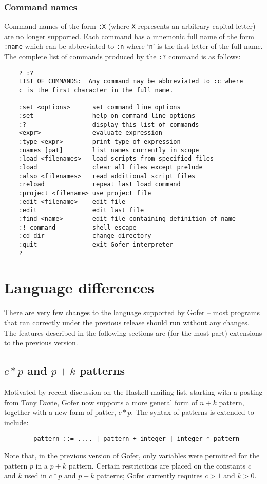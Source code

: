 \subsubsection{Command names}
Command names of the form \verb":X" (where \verb"X" 
represents an arbitrary capital
letter) are no longer supported.  Each command has a mnemonic full name
of the form \verb":name" which can be abbreviated to \verb":n" 
where `\verb"n"' is the first
letter of the full name.  The complete list of commands produced by the
\verb":?" command is as follows:
\begin{verbatim}
    ? :?
    LIST OF COMMANDS:  Any command may be abbreviated to :c where
    c is the first character in the full name.
 
    :set <options>      set command line options
    :set                help on command line options
    :?                  display this list of commands
    <expr>              evaluate expression
    :type <expr>        print type of expression
    :names [pat]        list names currently in scope
    :load <filenames>   load scripts from specified files
    :load               clear all files except prelude
    :also <filenames>   read additional script files
    :reload             repeat last load command
    :project <filename> use project file
    :edit <filename>    edit file
    :edit               edit last file
    :find <name>        edit file containing definition of name
    :! command          shell escape
    :cd dir             change directory
    :quit               exit Gofer interpreter
    ?
\end{verbatim}


\section{Language differences}

There are very few changes to the language supported by Gofer -- most
programs that ran correctly under the previous release should run
without any changes.  The features described in the following sections
are (for the most part) extensions to the previous version.

\subsection{$c*p$ and $p+k$ patterns}
Motivated by recent discussion on the Haskell mailing list, starting
with a posting from Tony Davie, Gofer now supports a more general form
of $n+k$ pattern, together with a new form of patter, $c*p$.  The syntax of
patterns is extended to include:
\begin{verbatim}
        pattern ::= .... | pattern + integer | integer * pattern
\end{verbatim}
Note that, in the previous version of Gofer, only variables were
permitted for the pattern $p$ in a $p+k$ pattern.  Certain restrictions are
placed on the constants $c$ and $k$ used in $c*p$ and $p+k$ patterns; Gofer
currently requires $c>1$ and $k>0$.

